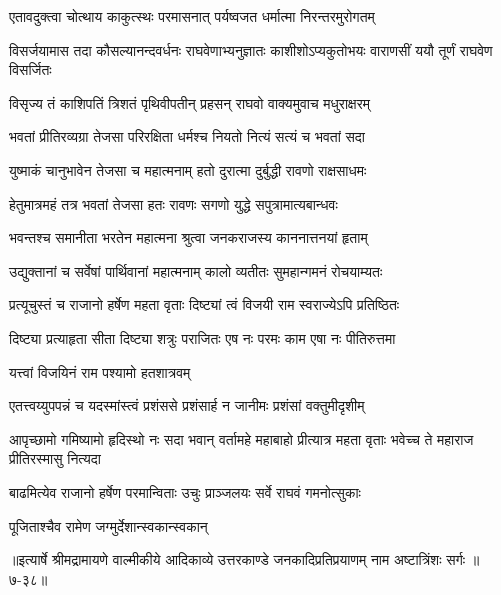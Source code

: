 \twolineshloka
{एतावदुक्त्वा चोत्थाय काकुत्स्थः परमासनात्}
{पर्यष्वजत धर्मात्मा निरन्तरमुरोगतम्} %

\threelineshloka
{विसर्जयामास तदा कौसल्यानन्दवर्धनः}
{राघवेणाभ्यनुज्ञातः काशीशोऽप्यकुतोभयः}
{वाराणसीं ययौ तूर्णं राघवेण विसर्जितः} %

\twolineshloka
{विसृज्य तं काशिपतिं त्रिशतं पृथिवीपतीन्}
{प्रहसन् राघवो वाक्यमुवाच मधुराक्षरम्} %

\twolineshloka
{भवतां प्रीतिरव्यग्रा तेजसा परिरक्षिता}
{धर्मश्च नियतो नित्यं सत्यं च भवतां सदा} %

\twolineshloka
{युष्माकं चानुभावेन तेजसा च महात्मनाम्}
{हतो दुरात्मा दुर्बुद्धी रावणो राक्षसाधमः} %

\twolineshloka
{हेतुमात्रमहं तत्र भवतां तेजसा हतः}
{रावणः सगणो युद्धे सपुत्रामात्यबान्धवः} %

\twolineshloka
{भवन्तश्च समानीता भरतेन महात्मना}
{श्रुत्वा जनकराजस्य काननात्तनयां हृताम्} %

\twolineshloka
{उद्युक्तानां च सर्वेषां पार्थिवानां महात्मनाम्}
{कालो व्यतीतः सुमहान्गमनं रोचयाम्यतः} %

\twolineshloka
{प्रत्यूचुस्तं च राजानो हर्षेण महता वृताः}
{दिष्ट्यां त्वं विजयी राम स्वराज्येऽपि प्रतिष्ठितः} %

\twolineshloka
{दिष्ट्या प्रत्याहृता सीता दिष्ट्या शत्रुः पराजितः}
{एष नः परमः काम एषा नः पीतिरुत्तमा} %

\onelineshloka
{यत्त्वां विजयिनं राम पश्यामो हतशात्रवम्} %

\twolineshloka
{एतत्त्वय्युपपन्नं च यदस्मांस्त्वं प्रशंससे}
{प्रशंसार्ह न जानीमः प्रशंसां वक्तुमीदृशीम्} %

\threelineshloka
{आपृच्छामो गमिष्यामो हृदिस्थो नः सदा भवान्}
{वर्तामहे महाबाहो प्रीत्यात्र महता वृताः}
{भवेच्च ते महाराज प्रीतिरस्मासु नित्यदा} %

\twolineshloka
{बाढमित्येव राजानो हर्षेण परमान्विताः}
{उचुः प्राञ्जलयः सर्वे राघवं गमनोत्सुकाः} %

\onelineshloka
{पूजिताश्चैव रामेण जग्मुर्देशान्स्वकान्स्वकान्} %


॥इत्यार्षे श्रीमद्रामायणे वाल्मीकीये आदिकाव्ये उत्तरकाण्डे जनकादिप्रतिप्रयाणम् नाम अष्टात्रिंशः सर्गः ॥७-३८॥
